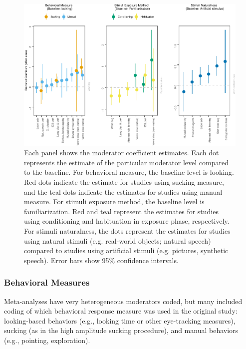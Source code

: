 \documentclass[10pt, letterpaper]{article}
\newenvironment{CodeChunk}{}{}
\begin{document}
\begin{CodeChunk}
\begin{figure}[t!]

{\centering \includegraphics{figs/mod_plot-1} 

}

\caption[Each panel shows the moderator coefficient estimates]{Each panel shows the moderator coefficient estimates. Each dot represents the estimate of the particular moderator level compared to the baseline. For behavioral measure, the baseline level is looking. Red dots indicate the estimate for studies using sucking measure, and the teal dots indicate the estimates for studies using manual measure. For stimuli exposure method, the baseline level is familiarization. Red and teal represent the estimates for studies using conditioning and habituation in exposure phase, respectively. For stimuli naturalness, the dots represent the estimates for studies using natural stimuli (e.g. real-world objects; natural speech) compared to studies using artificial stimuli (e.g. pictures, synthetic speech). Error bars show 95\% confidence intervals.}\label{fig:mod_plot}
\end{figure}
\end{CodeChunk}

\hypertarget{behavioral-measures}{%
\subsubsection{Behavioral Measures}\label{behavioral-measures}}

Meta-analyses have very heterogeneous moderators coded, but many
included coding of which behavioral response measure was used in the
original study: looking-based behaviors (e.g., looking time or other
eye-tracking measures), sucking (as in the high amplitude sucking
procedure), and manual behaviors (e.g., pointing, exploration).
\end{document}
